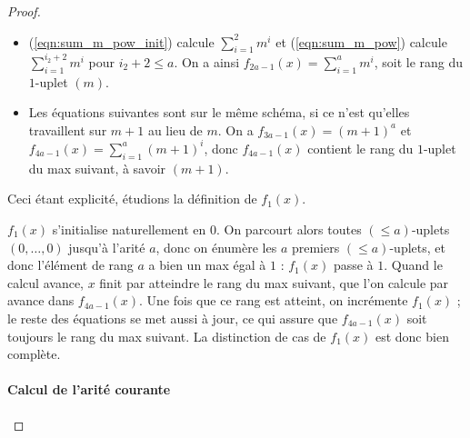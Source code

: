 \documentclass{report}
\newcommand{\leqa}{\left( \leqslant a \right)}
\begin{document}
\begin{proof}
\begin{itemize}
				\item 	(\ref{eqn:sum_m_pow_init}) calcule $\sum_{i = 1}^{2} m^i$ et (\ref{eqn:sum_m_pow}) calcule $\sum_{i = 1}^{i_2+2} m^i$ pour $i_2+2 \leqslant a$. On a ainsi $f_{2a-1}(x) = \sum_{i = 1}^{a} m^i$, soit le rang du $1$-uplet $(m)$.
				
				\item 	Les équations suivantes sont sur le même schéma, si ce n'est qu'elles travaillent sur $m+1$ au lieu de $m$. On a $f_{3a-1}(x) = (m+1)^a$ et $f_{4a-1}(x) = \sum_{i = 1}^{a} (m+1)^i$, donc $f_{4a-1}(x)$ contient le rang du $1$-uplet du max suivant, à savoir $(m+1)$. 
			\end{itemize}
			
			Ceci étant explicité, étudions la définition de $f_1(x)$. 
			
			$f_1(x)$ s'initialise naturellement en $0$. On parcourt alors toutes $\leqa$-uplets $(0, \dots, 0)$ jusqu'à l'arité $a$, donc on énumère les $a$ premiers $\leqa$-uplets, et donc l'élément de rang $a$ a bien un max égal à $1$ : $f_1(x)$ passe à $1$. Quand le calcul avance, $x$ finit par atteindre le rang du max suivant, que l'on calcule par avance dans $f_{4a-1}(x)$. Une fois que ce rang est atteint, on incrémente $f_1(x)$ ; le reste des équations se met aussi à jour, ce qui assure que $f_{4a-1}(x)$ soit toujours le rang du max suivant. La distinction de cas de $f_1(x)$ est donc bien complète.
			
			\paragraph{Calcul de l'arité courante}
		
	\end{proof}
	
	
	
	
	
	
	
	
	
	
	
	
	
	
	
	
	
	
	
	
\end{document}
